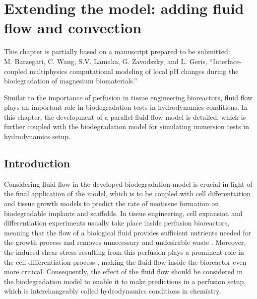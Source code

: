 \chapter{Extending the model: adding fluid flow and convection}\label{ch:fluid}

\begin{tcolorbox}
This chapter is partially based on a manuscript prepared to be submitted:\\
M. Barzegari, C. Wang, S.V. Lamaka, G. Zavodszky, and L. Geris, ``Interface-coupled multiphysics computational modeling of local pH changes during the biodegradation of magnesium biomaterials.''
\end{tcolorbox}

Similar to the importance of perfusion in tissue engineering bioreactors, fluid flow plays an important role in biodegradation tests in hydrodynamics conditions. In this chapter, the development of a parallel fluid flow model is detailed, which is further coupled with the biodegradation model for simulating immersion tests in hydrodynamics setup.

\section{Introduction}

Considering fluid flow in the developed biodegradation model is crucial in light of the final application of the model, which is to be coupled with cell differentiation and tissue growth models to predict the rate of neotissue formation on biodegradable implants and scaffolds. In tissue engineering, cell expansion and differentiation experiments usually take place inside perfusion bioreactors, meaning that the flow of a biological fluid provides sufficient nutrients needed for the growth process and removes unnecessary and undesirable waste \cite{Sikavitsas2005,Grayson2010,Sonnaert2014}. Moreover, the induced shear stress resulting from this perfusion plays a prominent role in the cell differentiation process \cite{Song2013,McCoy2012,Rauh2011,Papantoniou2013}, making the fluid flow inside the bioreactor even more critical. Consequently, the effect of the fluid flow should be considered in the biodegradation model to enable it to make predictions in a perfusion setup, which is interchangeably called hydrodynamics conditions in chemistry.

